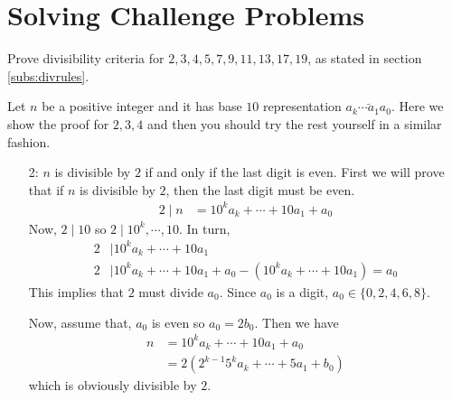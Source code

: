 \chapter{Solving Challenge Problems}\label{ch:solved}


\begin{problem}
	Prove divisibility criteria for $2,3,4,5,7,9,11,13,17,19$, as stated in section \eqref{subs:divrules}.
\end{problem}

\begin{solution}
	Let $n$ be a positive integer and it has base $10$ representation $\bar{a_k\cdots a_1a_0}$. Here we show the proof for $2,3,4$ and then you should try the rest yourself in a similar fashion.
		\begin{enumerate}
			\item[2:] $n$ is divisible by $2$ if and only if the last digit is even. First we will prove that if $n$ is divisible by $2$, then the last digit must be even.
					\begin{align*}
						2\mid n & = 10^ka_k+\cdots+10a_1+a_0
					\end{align*}
				Now, $2\mid 10$ so $2\mid 10^k,\cdots,10$. In turn,
					\begin{align*}
						2 & \mid 10^ka_k+\cdots+10a_1\\
						2 & \mid 10^ka_k+\cdots+10a_1+a_0-(10^ka_k+\cdots+10a_1)=a_0
					\end{align*}
				This implies that $2$ must divide $a_0$. Since $a_0$ is a digit, $a_0\in\{0,2,4,6,8\}$.

				Now, assume that, $a_0$ is even so $a_0=2b_0$. Then we have
					\begin{align*}
						n & = 10^ka_k+\cdots+10a_1+a_0\\
				  & = 2(2^{k-1}5^ka_k+\cdots+5a_1+b_0)
					\end{align*}
				which is obviously divisible by $2$.


\end{enumerate}
\end{solution}
